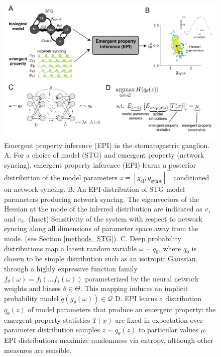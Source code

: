 \documentclass[11pt]{article}
\begin{document}
\begin{figure}
\begin{center}
\includegraphics[scale=0.38]{figures/fig1/fig1.pdf}
\end{center}
\caption{Emergent property inference (EPI) in the stomatogastric ganglion.  A. For a choice of model (STG) and emergent property (network syncing), emergent property inference (EPI) learns a posterior distribution of the model parameters  $z = \left[g_{\text{el}}, g_{\text{synA}} \right]^\top$ conditioned on network syncing. B. An EPI distribution of STG model parameters producing network syncing.  The eigenvectors of the Hessian at the mode of the inferred distribution are indicated as $v_1$ and $v_2$.   (Inset) Sensitivity of the system with respect to network syncing along all dimensions of parameter space away from the mode. (see Section \ref{methods_STG}).  C. Deep probability distributions map a latent random variable $\omega \sim q_0$, where $q_0$ is chosen to be simple distribution such as an isotropic Gaussian, through a highly expressive function family $f_\theta(\omega) = f_l(...f_1(\omega))$ parameterized by the neural network weights and biases $\theta \in \Theta$. This mapping induces an implicit probability model $q(g_\theta(\omega)) \in \mathcal{Q}$ D. EPI learns a distribution $q_\theta(z)$ of model parameters that produce an emergent property: the emergent property statistics $T(x)$ are fixed in expectation over parameter distribution samples $z \sim q_\theta(z)$ to particular values $\mu$.  EPI distributions maximize randomness via entropy, although other measures are sensible.  }
\end{figure}


\end{document}
